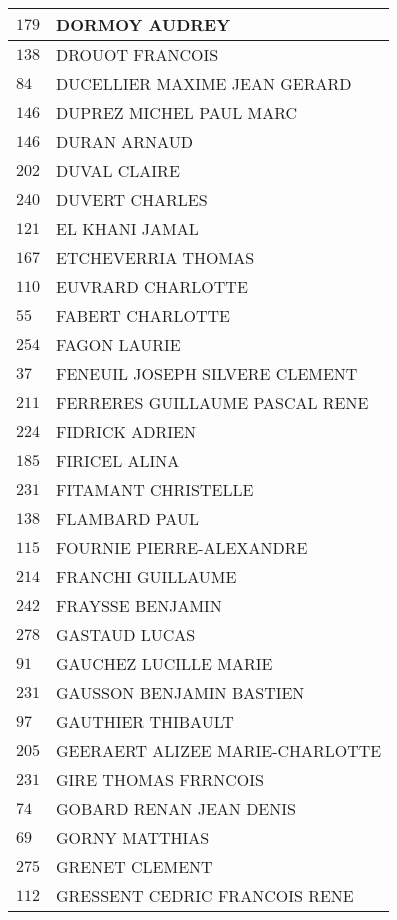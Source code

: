 \begin{xltabular}{\linewidth}{|l|X|}
    \hline
    $179$ & DORMOY AUDREY \\
    \hline
    $138$ & DROUOT FRANCOIS \\
    \hline
    $84$ & DUCELLIER MAXIME JEAN GERARD \\
    \hline
    $146$ & DUPREZ MICHEL PAUL MARC \\
    \hline
    $146$ & DURAN ARNAUD \\
    \hline
    $202$ & DUVAL CLAIRE \\
    \hline
    $240$ & DUVERT CHARLES \\
    \hline
    $121$ & EL KHANI JAMAL \\
    \hline
    $167$ & ETCHEVERRIA THOMAS \\
    \hline
    $110$ & EUVRARD CHARLOTTE \\
    \hline
    $55$ & FABERT CHARLOTTE \\
    \hline
    $254$ & FAGON LAURIE \\
    \hline
    $37$ & FENEUIL JOSEPH SILVERE CLEMENT \\
    \hline
    $211$ & FERRERES GUILLAUME PASCAL RENE \\
    \hline
    $224$ & FIDRICK ADRIEN \\
    \hline
    $185$ & FIRICEL ALINA \\
    \hline
    $231$ & FITAMANT CHRISTELLE \\
    \hline
    $138$ & FLAMBARD PAUL \\
    \hline
    $115$ & FOURNIE PIERRE-ALEXANDRE \\
    \hline
    $214$ & FRANCHI GUILLAUME \\
    \hline
    $242$ & FRAYSSE BENJAMIN \\
    \hline
    $278$ & GASTAUD LUCAS \\
    \hline
    $91$ & GAUCHEZ LUCILLE MARIE \\
    \hline
    $231$ & GAUSSON BENJAMIN BASTIEN \\
    \hline
    $97$ & GAUTHIER THIBAULT \\
    \hline
    $205$ & GEERAERT ALIZEE MARIE-CHARLOTTE \\
    \hline
    $231$ & GIRE THOMAS FRRNCOIS \\
    \hline
    $74$ & GOBARD RENAN JEAN DENIS \\
    \hline
    $69$ & GORNY MATTHIAS \\
    \hline
    $275$ & GRENET CLEMENT \\
    \hline
    $112$ & GRESSENT CEDRIC FRANCOIS RENE \\

\end{xltabular}
